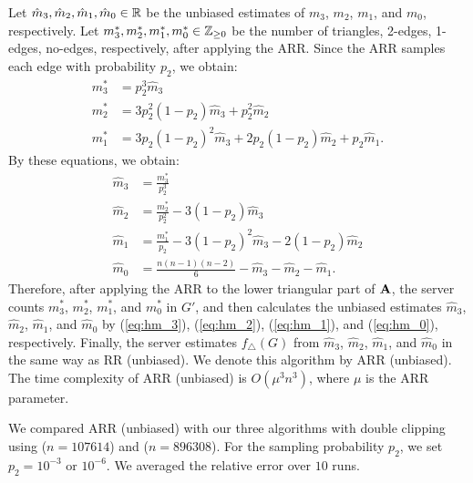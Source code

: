 Let $\hat{m}_3, \hat{m}_2, \hat{m}_1, \hat{m}_0 \in \mathbb{R}$ be the unbiased estimates of $m_3$, $m_2$, $m_1$, and $m_0$, respectively. 
Let $m_3^*, m_2^*, m_1^*, m_0^* \in \mathbb{Z}_{\ge0}$ be the number of triangles, 2-edges, 1-edges, no-edges, respectively, after applying the ARR.
Since the ARR samples each edge with probability $p_2$, we obtain:
\begin{align*}
    m_3^* &= \textstyle{p_2^3 \hat{m}_3} \\
    m_2^* &= \textstyle{3p_2^2(1-p_2) \hat{m}_3 + p_2^2 \hat{m}_2} \\
    m_1^* &= \textstyle{3p_2(1-p_2)^2 \hat{m}_3 + 2p_2(1-p_2) \hat{m}_2 + p_2 \hat{m}_1.}
\end{align*}
By these equations,
we obtain:
\begin{align}
    \hat{m}_3 &= \textstyle{\frac{m_3^*}{p_2^3}} \label{eq:hm_3} \\
    \hat{m}_2 &= \textstyle{\frac{m_2^*}{p_2^2} - 3(1-p_2)\hat{m}_3} \label{eq:hm_2} \\
    \hat{m}_1 &= \textstyle{\frac{m_1^*}{p_2} - 3(1-p_2)^2\hat{m}_3 - 2(1-p_2)\hat{m}_2} \label{eq:hm_1} \\
    \hat{m}_0 &= \textstyle{\frac{n(n-1)(n-2)}{6} - \hat{m}_3 - \hat{m}_2 - \hat{m}_1.} \label{eq:hm_0}
\end{align}
Therefore, after applying the ARR to the lower triangular part of $\mathbf{A}$, the server counts $m_3^*$, $m_2^*$, $m_1^*$, and $m_0^*$ in $G'$, and then calculates the unbiased estimates $\hat{m}_3$, $\hat{m}_2$, $\hat{m}_1$, and $\hat{m}_0$ by (\ref{eq:hm_3}), (\ref{eq:hm_2}), (\ref{eq:hm_1}), and (\ref{eq:hm_0}), respectively.
Finally, the server estimates $f_\triangle(G)$ from $\hat{m}_3$, $\hat{m}_2$, $\hat{m}_1$, and $\hat{m}_0$ in the same way as \textsf{RR (unbiased)}.
We denote this algorithm by \textsf{ARR (unbiased)}.
The time complexity of \textsf{ARR (unbiased)} is $O(\mu^3 n^3)$, where $\mu$ is the ARR parameter.

We compared \textsf{ARR (unbiased)} with our three algorithms with double clipping using \GPlus{} ($n=107614$) and \IMDB{} ($n=896308$).
For the sampling probability $p_2$, we set $p_2 = 10^{-3}$ or $10^{-6}$.
We averaged the relative error over $10$ runs.

